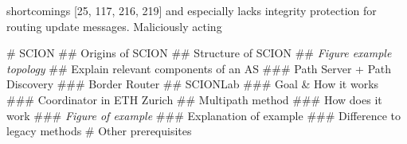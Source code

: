 \documentclass[thesis.tex]{subfiles}
\begin{document}
shortcomings [25, 117, 216,
219] and especially lacks integrity protection for routing update messages.
Maliciously acting
\begin{easylist}
    \MyListProperties
    # SCION
    ## Origins of SCION
    ## Structure of SCION
    ## \textit{Figure example topology}
    ## Explain relevant components of an AS
    ### Path Server + Path Discovery
    ### Border Router
    ## SCIONLab
    ### Goal \& How it works
    ### Coordinator in ETH Zurich
    ## Multipath method
    ### How does it work
    ### \textit{Figure of example}
    ### Explanation of example
    ### Difference to legacy methods
    # Other prerequisites
\end{easylist}

\subfilebib %
\end{document}
